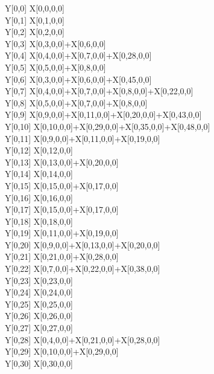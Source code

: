 \documentclass[11pt]{article}
\begin{document}
        Y[0,0] \leq X[0,0,0,0]\\
        Y[0,1] \leq X[0,1,0,0]\\
        Y[0,2] \leq X[0,2,0,0]\\
        Y[0,3] \leq X[0,3,0,0]+X[0,6,0,0]\\
        Y[0,4] \leq X[0,4,0,0]+X[0,7,0,0]+X[0,28,0,0]\\
        Y[0,5] \leq X[0,5,0,0]+X[0,8,0,0]\\
        Y[0,6] \leq X[0,3,0,0]+X[0,6,0,0]+X[0,45,0,0]\\
        Y[0,7] \leq X[0,4,0,0]+X[0,7,0,0]+X[0,8,0,0]+X[0,22,0,0]\\
        Y[0,8] \leq X[0,5,0,0]+X[0,7,0,0]+X[0,8,0,0]\\
        Y[0,9] \leq X[0,9,0,0]+X[0,11,0,0]+X[0,20,0,0]+X[0,43,0,0]\\
        Y[0,10] \leq X[0,10,0,0]+X[0,29,0,0]+X[0,35,0,0]+X[0,48,0,0]\\
        Y[0,11] \leq X[0,9,0,0]+X[0,11,0,0]+X[0,19,0,0]\\
        Y[0,12] \leq X[0,12,0,0]\\
        Y[0,13] \leq X[0,13,0,0]+X[0,20,0,0]\\
        Y[0,14] \leq X[0,14,0,0]\\
        Y[0,15] \leq X[0,15,0,0]+X[0,17,0,0]\\
        Y[0,16] \leq X[0,16,0,0]\\
        Y[0,17] \leq X[0,15,0,0]+X[0,17,0,0]\\
        Y[0,18] \leq X[0,18,0,0]\\
        Y[0,19] \leq X[0,11,0,0]+X[0,19,0,0]\\
        Y[0,20] \leq X[0,9,0,0]+X[0,13,0,0]+X[0,20,0,0]\\
        Y[0,21] \leq X[0,21,0,0]+X[0,28,0,0]\\
        Y[0,22] \leq X[0,7,0,0]+X[0,22,0,0]+X[0,38,0,0]\\
        Y[0,23] \leq X[0,23,0,0]\\
        Y[0,24] \leq X[0,24,0,0]\\
        Y[0,25] \leq X[0,25,0,0]\\
        Y[0,26] \leq X[0,26,0,0]\\
        Y[0,27] \leq X[0,27,0,0]\\
        Y[0,28] \leq X[0,4,0,0]+X[0,21,0,0]+X[0,28,0,0]\\
        Y[0,29] \leq X[0,10,0,0]+X[0,29,0,0]\\
        Y[0,30] \leq X[0,30,0,0]\\
\end{document}
